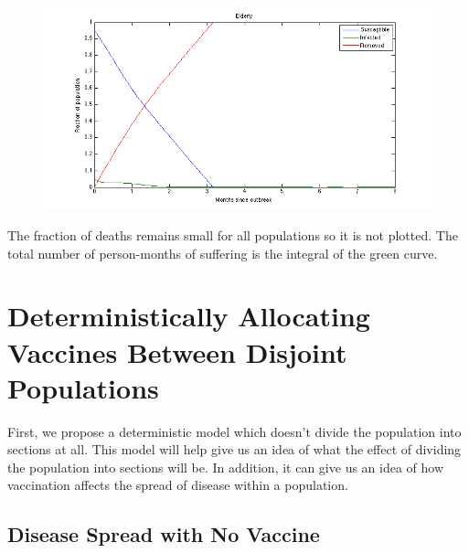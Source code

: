 \documentclass[titlepage]{article}
\begin{document}
    \begin{figure}[H]
    \centering
        \includegraphics[width=\textwidth]{figures/ryan_plot_04.png}
    \end{figure}

    The fraction of deaths remains small for all populations so it is not plotted. The total number of person-months of suffering is the integral of the green curve.

\section{Deterministically Allocating Vaccines Between Disjoint Populations}

First, we propose a deterministic model which doesn't divide the population
	into sections at all.
This model will help give us an idea of what the effect of dividing
	the population into sections will be.
In addition, it can give us an idea of how vaccination affects the spread of
	disease within a population.

\subsection{Disease Spread with No Vaccine}
\end{document}
